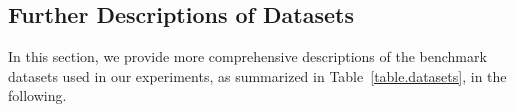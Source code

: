 \subsection{Further Descriptions of Datasets} \label{app.dataset}
In this section, we provide more comprehensive descriptions of the benchmark datasets used in our experiments, as summarized in Table~\ref{table.datasets},
in the following.





